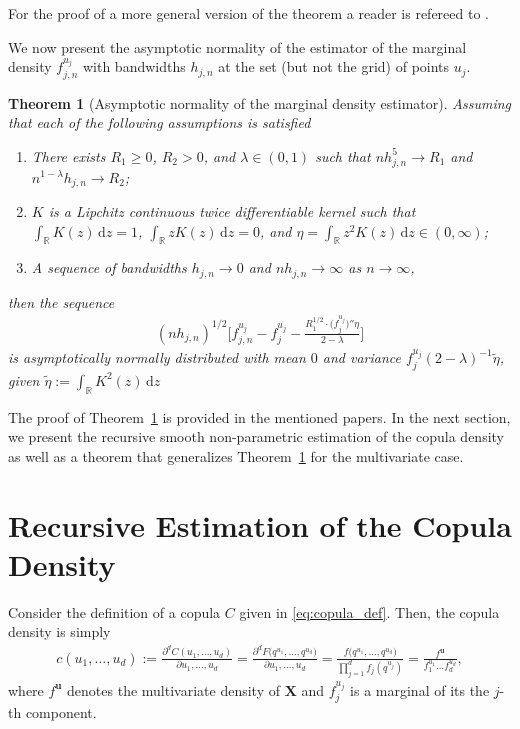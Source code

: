 \documentclass[12pt]{article}
\newtheorem{theorem}{Theorem}
\begin{document}
	For the proof of a more general version of the theorem a reader is refereed to \textcite{Amiri2014,Camirand}. 
	
	We now present the asymptotic normality of the estimator of the marginal density $ f_{j, n}^{u_j} $ with bandwidths $ h_{j, n} $ at the set (but not the grid) of points $ u_j $.
	\begin{theorem}[Asymptotic normality of the marginal density estimator] \label{thm:asym_norm_marginal}
		Assuming that each of the following assumptions is satisfied
		\begin{enumerate}
			\item There exists $ R_1 \geq 0 $, $ R_2 > 0 $, and $ \lambda \in (0, 1) $ such that $ n h_{j, n}^5 \rightarrow R_1 $ and $ n^{1-\lambda}h_{j, n} \rightarrow R_2 $;
			\item $ K $ is a Lipchitz continuous twice differentiable kernel such that $ \int_\mathbb{R} K(z)\, \text{d}z = 1 $, $ \int_\mathbb{R} zK(z)\, \text{d}z = 0 $, and $\eta = \int_\mathbb{R} z^2K(z)\, \text{d}z \in (0, \infty) $;
			\item A sequence of bandwidths $ h_{j, n} \rightarrow 0 $ and $ n h_{j, n} \rightarrow \infty $ as $ n \rightarrow \infty $, 
		\end{enumerate}
		then the sequence 
		\begin{align}
		(nh_{j, n})^{1/2}\Bigg[f^{u_j}_{j, n} - f^{u_j}_j - \frac{R_1^{1/2}\cdot\big(f_j^{u_j}\big)''\eta}{2 - \lambda}\Bigg]
		\end{align}
		is asymptotically normally distributed with mean $ 0 $ and variance $ f_j^{u_j}(2-\lambda)^{-1}\widetilde{\eta} $, given $ \widetilde{\eta}:=\int_\mathbb{R} K^2(z)\, \text{d}z $
	\end{theorem}
	
	The proof of Theorem~\ref{thm:asym_norm_marginal} is provided in the mentioned papers. In the next section, we present the recursive smooth non-parametric estimation of the copula density as well as a theorem that generalizes Theorem~\ref{thm:asym_norm_marginal} for the multivariate case.
	
	\section{Recursive Estimation of the Copula Density}\label{sec:copula_density}
	
	Consider the definition of a copula $ C $ given in \eqref{eq:copula_def}. Then, the copula density is simply 
	\begin{align}
		c(u_1, \dots, u_d) := \frac{\partial^d C(u_1, \dots, u_d)}{\partial u_1, \dots, u_d} = \frac{\partial^d F\big(q^{u_1}, \dots, q^{u_d}\big)}{\partial u_1, \dots, u_d} = \frac{f\big(q^{u_1}, \dots, q^{u_d}\big)}{\prod_{j=1}^{d}f_j(q^{u_j})} = \frac{f^{\mathbf{u}}}{f^{u_1}_1 \dots  f^{u_d}_d}, \label{eq:copula_density}
	\end{align}
	where $ f^{\mathbf{u}} $ denotes the multivariate density of $ \mathbf{X} $ and $ f_j^{u_j} $ is a marginal of its the $ j $-th component.
	
\end{document}
